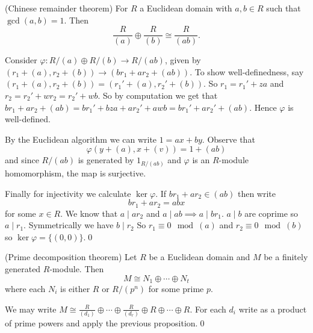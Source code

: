\documentclass{article}
\begin{document}
\begin{proposition}
	(Chinese remainder theorem) For $ R $ a Euclidean domain with $ a,b\in R $ such that $ \gcd(a,b)=1 $. Then
  \[
	  \frac R{(a)}\oplus \frac R{(b)}\cong \frac R{(ab)}.
  \]
\end{proposition}
\pf Consider $ \varphi: R/(a)\oplus R/(b)\to R/(ab) $, given by $ (r_1+(a),r_2+(b))\to (br_1+ar_2+(ab)) $. To show well-definedness, say $ (r_1+(a),r_2+(b))=(r_1'+(a),r_2'+(b)) $. So $ r_1=r_1'+za $ and $ r_2=r_2'+wr_2=r_2'+wb $. So by computation we get that $ br_1+ar_2+(ab)=br_1'+bza+ar_2'+awb=br_1'+ar_2'+(ab) $. Hence $ \varphi $ is well-defined.\par
By the Euclidean algorithm we can write $ 1=ax+by $. Observe that
\[
  \varphi(y+(a),x+(v))=1+(ab)
\]
and since $ R/(ab) $ is generated by $ 1_{R/(ab)} $ and $ \varphi $ is an $ R $-module homomorphism, the map is surjective.\par
Finally for injectivity we calculate $ \ker\varphi $. If $ br_1+ar_2\in (ab) $ then write
\[
  br_1+ar_2=abx
\]
for some $ x\in R $. We know that $ a \mid ar_2 $ and $ a \mid ab\implies a\mid br_1 $. $ a\mid b $ are coprime so $ a\mid r_1 $. Symmetrically we have $ b\mid r_2 $ So $ r_1\equiv 0 \mod (a) $ and $ r_2\equiv 0\mod (b) $ so $ \ker\varphi = \{(0,0)\} $.\qed
\begin{theorem}
	(Prime decomposition theorem) Let $ R $ be a Euclidean domain and $ M $ be a finitely generated $ R $-module. Then
\[
  M\cong N_1\oplus \cdots \oplus N_t
\]
where each $ N_i $ is either $ R $ or $ R/(p^n) $ for some prime $ p $.
\end{theorem} 
\pf We may write $ M\cong \frac R{(d_1)}\oplus \cdots \oplus \frac R{(d_r)}\oplus R\oplus \cdots \oplus R $. For each $ d_i $ write as a product of prime powers and apply the previous proposition.\qed
\end{document}
